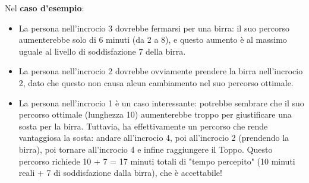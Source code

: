 \Explanations
Nel \textbf{caso d'esempio}:
\begin{itemize}
    \item La persona nell'incrocio 3 dovrebbe fermarsi per una birra: il suo percorso aumenterebbe solo di 6 minuti (da 2 a 8), e questo aumento è al massimo uguale al livello di soddisfazione 7 della birra.
    \item La persona nell'incrocio 2 dovrebbe ovviamente prendere la birra nell'incrocio 2, dato che questo non causa alcun cambiamento nel suo percorso ottimale.
    \item La persona nell'incrocio 1 è un caso interessante: potrebbe sembrare che il suo percorso ottimale (lunghezza 10) aumenterebbe troppo per giustificare una sosta per la birra. Tuttavia, ha effettivamente un percorso che rende vantaggiosa la sosta: andare all'incrocio 4, poi all'incrocio 2 (prendendo la birra), poi tornare all'incrocio 4 e infine raggiungere il Toppo. Questo percorso richiede 10 + 7 = 17 minuti totali di "tempo percepito" (10 minuti reali + 7 di soddisfazione dalla birra), che è accettabile!
\end{itemize}
